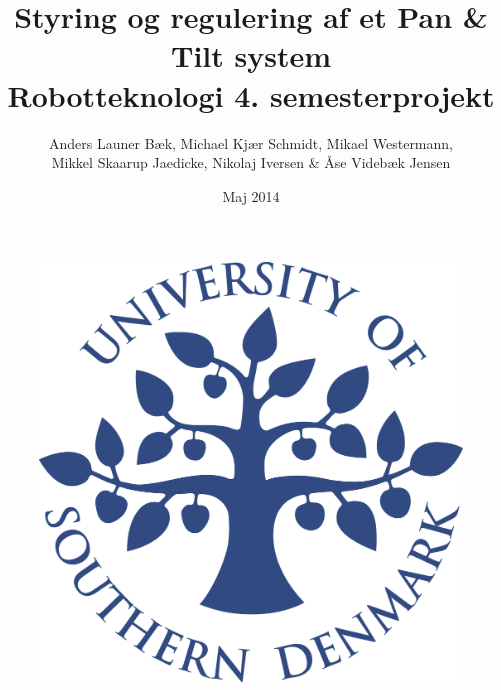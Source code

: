 \title{Styring og regulering af et Pan \& Tilt system \\Robotteknologi 4. semesterprojekt}
\author{Anders Launer Bæk, Michael Kjær Schmidt, Mikael Westermann, \\Mikkel Skaarup Jaedicke, Nikolaj Iversen \& Åse Videbæk Jensen}
\date{Maj 2014}
\begin{figure}
\centering
\includegraphics[width=1\textwidth]{graphics/forside.png}
\end{figure}
\maketitle


